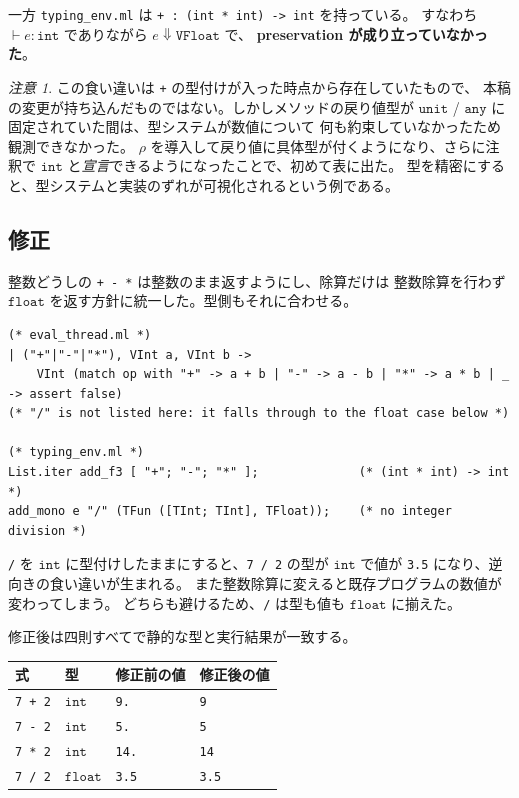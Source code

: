 \documentclass[11pt,a4paper]{ltjsarticle}
\theoremstyle{definition}
\theoremstyle{remark}
\newtheorem{remark}{注意}
\newcommand{\ty}[1]{\ensuremath{\mathtt{#1}}}
\begin{document}
一方 \texttt{typing\_env.ml} は \texttt{+ : (int * int) -> int} を持っている。
すなわち $\vdash e : \ty{int}$ でありながら $e \Downarrow \ty{VFloat}$ で、
\textbf{preservation が成り立っていなかった}。

\begin{remark}
この食い違いは \texttt{+} の型付けが入った時点から存在していたもので、
本稿の変更が持ち込んだものではない。しかしメソッドの戻り値型が
\ty{unit} / \ty{any} に固定されていた間は、型システムが数値について
何も約束していなかったため観測できなかった。
$\rho$ を導入して戻り値に具体型が付くようになり、さらに注釈で
\ty{int} と\emph{宣言}できるようになったことで、初めて表に出た。
型を精密にすると、型システムと実装のずれが可視化されるという例である。
\end{remark}

\subsection{修正}

整数どうしの \texttt{+ - *} は整数のまま返すようにし、除算だけは
整数除算を行わず \ty{float} を返す方針に統一した。型側もそれに合わせる。

\begin{lstlisting}
(* eval_thread.ml *)
| ("+"|"-"|"*"), VInt a, VInt b ->
    VInt (match op with "+" -> a + b | "-" -> a - b | "*" -> a * b | _ -> assert false)
(* "/" is not listed here: it falls through to the float case below *)

(* typing_env.ml *)
List.iter add_f3 [ "+"; "-"; "*" ];              (* (int * int) -> int *)
add_mono e "/" (TFun ([TInt; TInt], TFloat));    (* no integer division *)
\end{lstlisting}

\texttt{/} を \ty{int} に型付けしたままにすると、\texttt{7 / 2} の型が
\ty{int} で値が \texttt{3.5} になり、逆向きの食い違いが生まれる。
また整数除算に変えると既存プログラムの数値が変わってしまう。
どちらも避けるため、\texttt{/} は型も値も \ty{float} に揃えた。

修正後は四則すべてで静的な型と実行結果が一致する。

\begin{center}
\begin{tabular}{llll}
\toprule
式 & 型 & 修正前の値 & 修正後の値 \\
\midrule
\texttt{7 + 2} & \ty{int}   & \texttt{9.}   & \texttt{9} \\
\texttt{7 - 2} & \ty{int}   & \texttt{5.}   & \texttt{5} \\
\texttt{7 * 2} & \ty{int}   & \texttt{14.}  & \texttt{14} \\
\texttt{7 / 2} & \ty{float} & \texttt{3.5}  & \texttt{3.5} \\
\bottomrule
\end{tabular}
\end{center}
\end{document}
